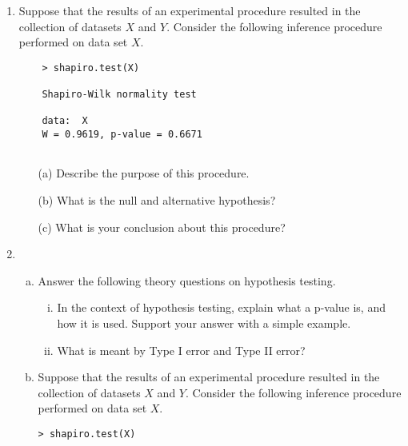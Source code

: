 \documentclass[a4paper,12pt]{article}
\begin{document}
\begin{enumerate}



\item Suppose that the results of an experimental procedure resulted in the collection of datasets $X$ and $Y$. Consider the following inference procedure performed on data set $X$.
\begin{center}
\begin{framed}
	\begin{verbatim}
	> shapiro.test(X)
	
	Shapiro-Wilk normality test
	
	data:  X
	W = 0.9619, p-value = 0.6671
	
	\end{verbatim}
\end{framed}
\end{center}


\begin{itemize}
	\item[(a)]  Describe the purpose of this procedure.
	\item[(b)]  What is the null and alternative hypothesis?
	\item[(c)]  What is your conclusion about this procedure?
\end{itemize}




\item

\begin{enumerate}[(a)]

\item Answer the following theory questions on hypothesis testing.
\begin{enumerate}[(i)]
\item  In the context of hypothesis testing, explain what a p-value is, and how it is used. Support your answer with a simple example.
\item  What is meant by Type I error and Type II error?
\end{enumerate}

 
\item Suppose that the results of an experimental procedure resulted in the collection of datasets $X$ and $Y$. Consider the following inference procedure performed on data set $X$.
\begin{center}
\begin{framed}
\begin{verbatim}
> shapiro.test(X)


\end{verbatim}
\end{framed}
\end{center}
\end{enumerate}
\end{enumerate}
\end{document}
